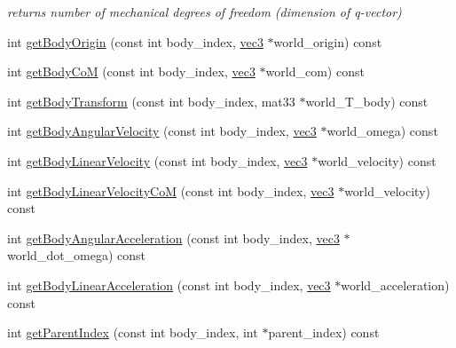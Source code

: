 \begin{CompactItemize}
\begin{CompactList}\small\item\em returns number of mechanical degrees of freedom (dimension of q-vector) \item\end{CompactList}\item 
int \hyperlink{classbt_inverse_dynamics_1_1_multi_body_tree_14722e25a8c6cc0cb0d1ba848577e174}{getBodyOrigin} (const int body\_\-index, \hyperlink{classbt_inverse_dynamics_1_1vec3}{vec3} $\ast$world\_\-origin) const 
\item 
int \hyperlink{classbt_inverse_dynamics_1_1_multi_body_tree_86d4152e8487c354a725e71e92851002}{getBodyCoM} (const int body\_\-index, \hyperlink{classbt_inverse_dynamics_1_1vec3}{vec3} $\ast$world\_\-com) const 
\item 
int \hyperlink{classbt_inverse_dynamics_1_1_multi_body_tree_582514119940a8dcc10d06cd97019143}{getBodyTransform} (const int body\_\-index, mat33 $\ast$world\_\-T\_\-body) const 
\item 
int \hyperlink{classbt_inverse_dynamics_1_1_multi_body_tree_441236989196e2c5f7219f420ddc6620}{getBodyAngularVelocity} (const int body\_\-index, \hyperlink{classbt_inverse_dynamics_1_1vec3}{vec3} $\ast$world\_\-omega) const 
\item 
int \hyperlink{classbt_inverse_dynamics_1_1_multi_body_tree_c8076ba03722eb2744d1cccd09bfeb41}{getBodyLinearVelocity} (const int body\_\-index, \hyperlink{classbt_inverse_dynamics_1_1vec3}{vec3} $\ast$world\_\-velocity) const 
\item 
int \hyperlink{classbt_inverse_dynamics_1_1_multi_body_tree_0e3e87b9f2531a8771fa7193449ca26d}{getBodyLinearVelocityCoM} (const int body\_\-index, \hyperlink{classbt_inverse_dynamics_1_1vec3}{vec3} $\ast$world\_\-velocity) const 
\item 
int \hyperlink{classbt_inverse_dynamics_1_1_multi_body_tree_1f216eaec9b229133a1a59ac0b415d13}{getBodyAngularAcceleration} (const int body\_\-index, \hyperlink{classbt_inverse_dynamics_1_1vec3}{vec3} $\ast$world\_\-dot\_\-omega) const 
\item 
int \hyperlink{classbt_inverse_dynamics_1_1_multi_body_tree_07aeba9ee7505e1c2a4c8a5f317bcf22}{getBodyLinearAcceleration} (const int body\_\-index, \hyperlink{classbt_inverse_dynamics_1_1vec3}{vec3} $\ast$world\_\-acceleration) const 
\item 
int \hyperlink{classbt_inverse_dynamics_1_1_multi_body_tree_fc4f7fc8066ceaa8f666fbad2fcbd33d}{getParentIndex} (const int body\_\-index, int $\ast$parent\_\-index) const 

\end{CompactItemize}
